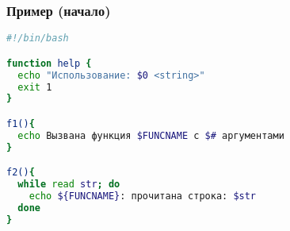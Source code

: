 \begin{frame}[fragile]
	\frametitle{Пример (начало)}
	\small
        \begin{lstlisting}[language=bash,frame=single]
#!/bin/bash

function help {
  echo "Использование: $0 <string>"
  exit 1
}

f1(){
  echo Вызвана функция $FUNCNAME с $# аргументами
}

f2(){
  while read str; do
    echo ${FUNCNAME}: прочитана строка: $str
  done
}
\end{lstlisting}

\end{frame}
